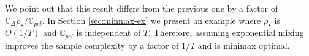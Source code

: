 \documentclass[opre,sglanonrev]{informs4}
\numberwithin{equation}{section}
\newcommand{\pow}[1]{^{(#1)}}
\newcommand{\lc}{\left\{}
\newcommand{\rc}{\right\}}
\newcommand{\Cbb}{\mathbb{C}}
\newcommand{\constant}{\Cbb}
\begin{document}
{{{%
{We point out that this result differs from the previous one by a factor of $\constant_\Delta\rho_\star/\constant_{pel}$. In Section \ref{sec:minmax-ex} we present an example where  $\rho_\star$ is $O(1/T)$ and $\constant_{pel}$ is independent of $T$. Therefore, assuming exponential mixing improves the sample complexity by a factor of $1/T$ and is minimax optimal. 

}
}}}
\end{document}
